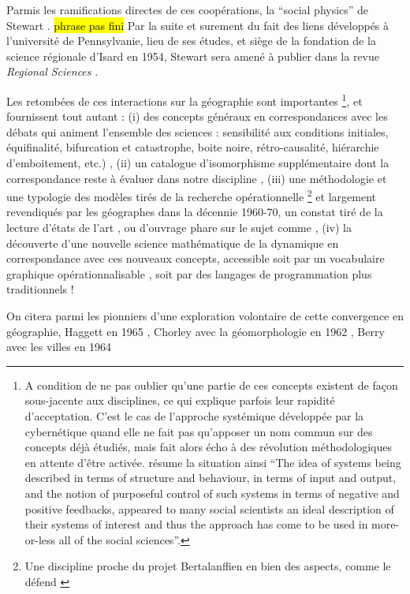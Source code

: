 Parmis les ramifications directes de ces coopérations, la \enquote{social physics} de Stewart \autocite{Stewart1947}. \hl{phrase pas fini}
Par la suite et surement du fait des liens développés à l'université de Pennsylvanie, lieu de ses études, et siège de la fondation de la science régionale d'Isard en 1954, Stewart sera amené à publier dans la revue \textit{Regional Sciences} \autocite{Stewart1958}.

Les retombées de ces interactions sur la géographie sont importantes \footnote{ A condition de ne pas oublier qu'une partie de ces concepts existent de façon sous-jacente aux disciplines, ce qui explique parfois leur rapidité d'acceptation. C'est le cas de l'approche systémique développée par la cybernétique quand elle ne fait pas qu'apposer un nom commun sur des concepts déjà étudiés, mais fait alors écho à des révolution méthodologiques en attente d'être activée. \textcite[5]{Batty1976} résume la situation ainsi \foreignquote{english}{The idea of systems being described in terms of structure and behaviour, in terms of input and output, and the notion of purposeful control of such systems in terms of negative and positive feedbacks, appeared to many social scientists an ideal description of their systems of interest and thus the approach has come to be used in more-or-less all of the social sciences}.}, et fournissent tout autant : (i) des concepts généraux en correspondances avec les débats qui animent l'ensemble des sciences : sensibilité aux conditions initiales, équifinalité, bifurcation et catastrophe, boite noire, rétro-causalité, hiérarchie d'emboitement, etc.) , (ii) un catalogue d'isomorphisme supplémentaire dont la correspondance reste à évaluer dans notre discipline \autocite{Wilson1969}, (iii)  une méthodologie et une typologie des modèles tirés de la recherche opérationnelle \autocite{Ackoff1962} \footnote{Une discipline proche du projet Bertalanffien en bien des aspects, comme le défend \autocite[801]{Pouvreau2013}} et largement revendiqués par les géographes dans la décennie 1960-70, un constat tiré de la lecture  d'états de l'art \autocite{Kohn1970}, ou d'ouvrage phare sur le sujet comme \autocite{Berry1964, Haggett1965}, (iv) la découverte d'une nouvelle science mathématique de la dynamique en correspondance avec ces nouveaux concepts, accessible soit par un vocabulaire graphique opérationnalisable \autocite{Forrester1961}, soit par des langages de programmation plus traditionnels !

On citera parmi les pionniers d'une exploration volontaire de cette convergence en géographie, Haggett en 1965 \autocite{Haggett1965}, Chorley avec la géomorphologie en 1962 \autocite{Chorley1962}, Berry avec les villes en 1964 \autocite{Berry1964}

